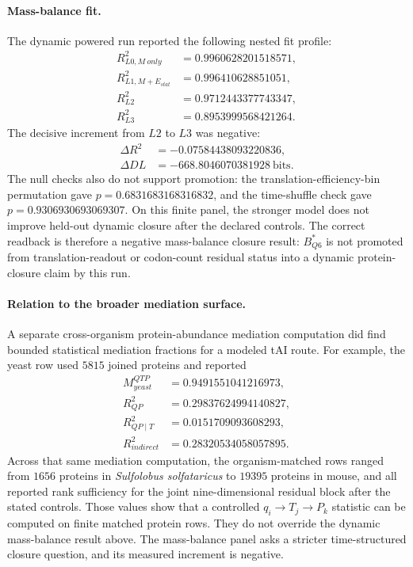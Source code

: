 \paragraph{Mass-balance fit.}
The dynamic powered run reported the following nested fit profile:
$$
\begin{aligned}
R^2_{L0,M\ only} &= 0.9960628201518571,\\
R^2_{L1,M+E_{stat}} &= 0.996410628851051,\\
R^2_{L2} &= 0.9712443377743347,\\
R^2_{L3} &= 0.8953999568421264.
\end{aligned}
$$
The decisive increment from $L2$ to $L3$ was negative:
$$
\begin{aligned}
\Delta R^2 &= -0.07584438093220836,\\
\Delta DL &= -668.8046070381928\ \text{bits}.
\end{aligned}
$$
The null checks also do not support promotion: the translation-efficiency-bin permutation gave $p=0.6831683168316832$, and the time-shuffle check gave $p=0.9306930693069307$.  On this finite panel, the stronger model does not improve held-out dynamic closure after the declared controls.  The correct readback is therefore a negative mass-balance closure result: $B^{\ast}_{Q6}$ is not promoted from translation-readout or codon-count residual status into a dynamic protein-closure claim by this run.

\paragraph{Relation to the broader mediation surface.}
A separate cross-organism protein-abundance mediation computation did find bounded statistical mediation fractions for a modeled tAI route.  For example, the yeast row used $5815$ joined proteins and reported
$$
\begin{aligned}
M^{QTP}_{yeast} &= 0.9491551041216973,\\
R^2_{QP} &= 0.29837624994140827,\\
R^2_{QP\mid T} &= 0.0151709093608293,\\
R^2_{indirect} &= 0.28320534058057895.
\end{aligned}
$$
Across that same mediation computation, the organism-matched rows ranged from $1656$ proteins in \emph{Sulfolobus solfataricus} to $19395$ proteins in mouse, and all reported rank sufficiency for the joint nine-dimensional residual block after the stated controls.  Those values show that a controlled $q_i \to T_j \to P_k$ statistic can be computed on finite matched protein rows.  They do not override the dynamic mass-balance result above.  The mass-balance panel asks a stricter time-structured closure question, and its measured increment is negative.

